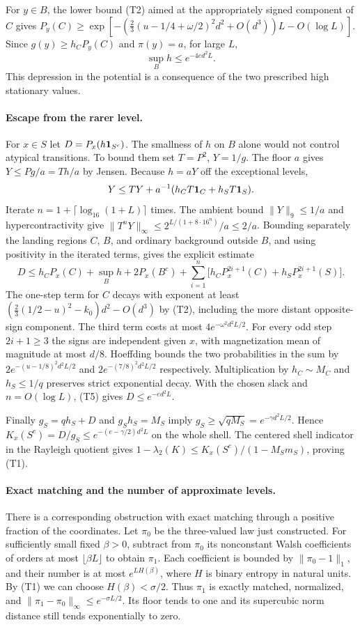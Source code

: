 For $y\in B$, the lower bound (T2) aimed at the appropriately signed
component of $C$ gives
$P_y(C)\ge\exp[-(\tfrac23(u-1/4+\omega/2)^2d^2+O(d^3))L-O(\log L)]$.
Since $g(y)\ge h_C P_y(C)$ and $\pi(y)=a$, for large $L$,
\[
 \sup_B h\le e^{-4ed^2 L}.
 \tag{T4}
\]
This depression in the potential is a consequence of the two
prescribed high stationary values.

\paragraph{Escape from the rarer level.}
For $x\in S$ let $D=P_x(h{\bf1}_{S^c})$. The smallness of $h$ on
$B$ alone would not control atypical transitions. To bound them set
$T=P^2$, $Y=1/g$. The floor $a$ gives $Y\le Pg/a=T h/a$ by Jensen.
Because $h=aY$ off the exceptional levels,
\[
 Y\le TY+a^{-1}(h_C T{\bf1}_C+h_S T{\bf1}_S).
\]
Iterate $n=1+\lceil\log_{16}(1+L)\rceil$ times. The ambient bound
$\|Y\|_9\le1/a$ and hypercontractivity give
$\|T^nY\|_\infty\le2^{L/(1+8\cdot16^n)}/a\le 2/a$.
Bounding separately the landing regions $C$, $B$, and ordinary
background outside $B$, and using positivity in the iterated terms,
gives the explicit estimate
\[
 D\le h_C P_x(C)+\sup_B h+2P_x(B^c)
       +\sum_{i=1}^n\big[h_C P_x^{2i+1}(C)+h_S P_x^{2i+1}(S)\big].
 \tag{T5}
\]
The one-step term for $C$ decays with exponent at least
$(\tfrac23(1/2-u)^2-k_0)d^2-O(d^3)$ by (T2), including the more
distant opposite-sign component. The third term costs at most
$4e^{-\omega^2d^2L/2}$. For every odd step $2i+1\ge3$ the signs are
independent given $x$, with magnetization mean of magnitude at most
$d/8$. Hoeffding bounds the two probabilities in the sum by
$2e^{-(u-1/8)^2d^2L/2}$ and $2e^{-(7/8)^2d^2L/2}$ respectively.
Multiplication by $h_C\sim M_C$ and $h_S\le1/q$ preserves strict
exponential decay. With the chosen slack and $n=O(\log L)$, (T5)
gives $D\le e^{-ed^2 L}$.

Finally $g_S=qh_S+D$ and $g_Sh_S=M_S$ imply
$g_S\ge\sqrt{qM_S}=e^{-\gamma d^2L/2}$. Hence
$K_x(S^c)=D/g_S\le e^{-(e-\gamma/2)d^2L}$ on the whole shell.
The centered shell indicator in the Rayleigh quotient gives
$1-\lambda_2(K)\le K_x(S^c)/(1-M_Sm_S)$, proving (T1).

\paragraph{Exact matching and the number of approximate levels.}
There is a corresponding obstruction with exact matching through a
positive fraction of the coordinates. Let $\pi_0$ be the three-valued
law just constructed. For sufficiently small fixed $\beta>0$, subtract
from $\pi_0$ its nonconstant Walsh coefficients of orders at most
$\lfloor\beta L\rfloor$ to obtain $\pi_1$. Each coefficient is bounded
by $\|\pi_0-1\|_1$, and their number is at most $e^{L H(\beta)}$,
where $H$ is binary entropy in natural units. By (T1) we can choose
$H(\beta)<\sigma/2$. Thus $\pi_1$ is exactly matched, normalized,
and $\|\pi_1-\pi_0\|_\infty\le e^{-\sigma L/2}$. Its floor tends to
one and its supercubic norm distance still tends exponentially to zero.

